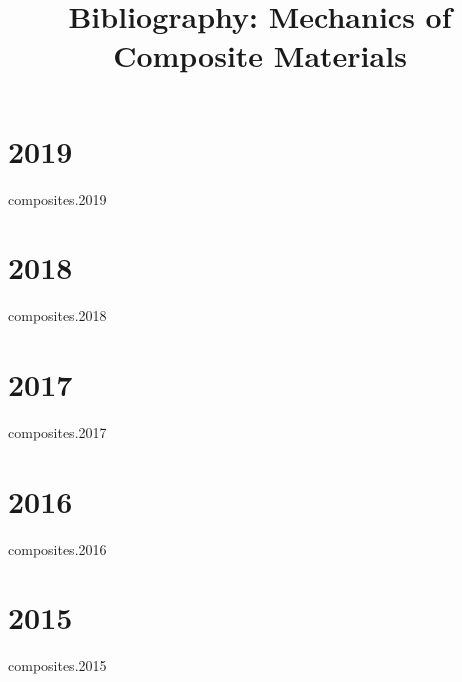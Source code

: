\documentclass[12pt]{article}
\begin{document}
%
\title{Bibliography: Mechanics of Composite Materials}%


\date{}

\maketitle

\section*{2019}
\begin{btSect}{composites.2019}
\btPrintAll
\end{btSect}

\section*{2018}
\begin{btSect}{composites.2018}
\btPrintAll
\end{btSect}

\section*{2017}
\begin{btSect}{composites.2017}
\btPrintAll
\end{btSect}

\section*{2016}
\begin{btSect}{composites.2016}
\btPrintAll
\end{btSect}

\section*{2015}
\begin{btSect}{composites.2015}
\btPrintAll
\end{btSect}
\end{document}
